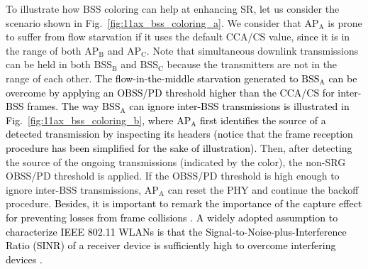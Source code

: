 \documentclass{ieeeaccess}
\begin{document}
To illustrate how BSS coloring can help at enhancing SR, let us consider the scenario shown in Fig.~\ref{fig:11ax_bss_coloring_a}. We consider that $\text{AP}_\text{A}$ is prone to suffer from flow starvation if it uses the default CCA/CS value, \textcolor{black}{since it is} in the range of both $\text{AP}_\text{B}$ and $\text{AP}_\text{C}$. Note that simultaneous downlink transmissions can be held in both $\text{BSS}_\text{B}$ and $\text{BSS}_\text{C}$ because the transmitters are not in the range of each other. \textcolor{black}{The flow-in-the-middle starvation generated to $\text{BSS}_\text{A}$ can be overcome by applying an OBSS/PD threshold higher than the CCA/CS for inter-BSS frames. The way $\text{BSS}_\text{A}$ can ignore inter-BSS transmissions is illustrated in Fig.~\ref{fig:11ax_bss_coloring_b}, where $\text{AP}_\text{A}$ first identifies the source of a detected transmission by inspecting its headers (notice that the frame reception procedure has been simplified for the sake of illustration).} Then, after detecting the source of the ongoing transmissions (indicated by the color), the non-SRG OBSS/PD threshold is applied. If the OBSS/PD threshold is high enough to ignore inter-BSS transmissions, $\text{AP}_\text{A}$ can reset the PHY and continue the backoff procedure. \textcolor{black}{Besides, it is important to remark the importance of the capture effect for preventing losses from frame collisions \cite{lee2007experimental}. A widely adopted assumption to characterize IEEE 802.11 WLANs is that the Signal-to-Noise-plus-Interference Ratio (SINR) of a receiver device is sufficiently high to overcome interfering devices \cite{durvy2007modeling}.}
\end{document}
